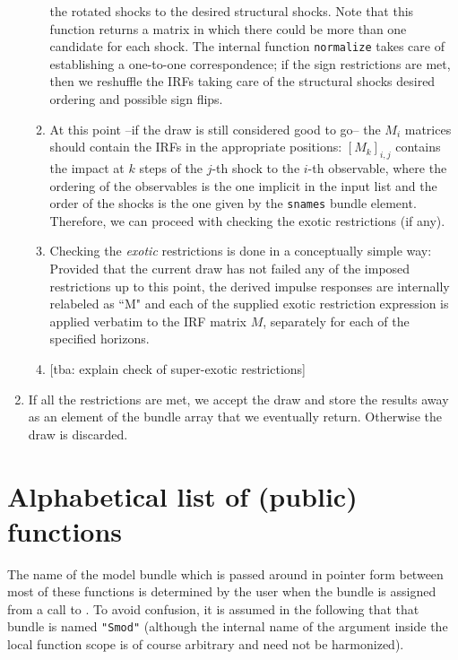 \documentclass[a4paper,10pt]{article}
\newcommand{\dtk}[1]{\texttt{\detokenize{#1}}}
\begin{document}
\begin{enumerate}
\begin{enumerate}
      the rotated shocks to the desired structural shocks. Note that this
      function returns a matrix in which there could be more than one candidate
      for each shock. The internal function \texttt{normalize} takes care of
      establishing a one-to-one correspondence; if the sign restrictions are
      met, then we reshuffle the IRFs taking care of the structural shocks
      desired ordering and possible sign flips.
    \item At this point --if the draw is still considered good to go-- the $M_i$
      matrices should contain the IRFs in the appropriate positions:
      $[M_k]_{i,j}$ contains the impact at $k$ steps of the $j$-th shock to the
      $i$-th observable, where the ordering of the observables is the one
      implicit in the input list and the order of the shocks is the one given by
      the \texttt{snames} bundle element. Therefore, we can proceed with
      checking the exotic restrictions (if any).
    \item Checking the \emph{exotic} restrictions is done in a conceptually
      simple way: Provided that the current draw has not failed any of the
      imposed restrictions up to this point, the derived impulse responses are
      internally relabeled as ``M" and each of the supplied exotic restriction
      expression is applied verbatim to the IRF matrix $M$, separately for each
      of the specified horizons.
    \item{} [tba: explain check of super-exotic restrictions]  
      
    \end{enumerate}
  \item If all the restrictions are met, we accept the draw and store the
    results away as an element of the bundle array that we eventually
    return. Otherwise the draw is discarded.
\end{enumerate}

\clearpage

\section{Alphabetical list of (public) functions}
\label{sec:syntax}

The name of the model bundle which is passed around in pointer form between 
most of these functions is determined by the user when the bundle is assigned
from a call to \dtk{SVAR_setup}. To avoid confusion, it is assumed in the
following that that bundle is named \texttt{"Smod"} (although the internal 
name of the argument inside the local function scope is of course arbitrary 
and need not be harmonized). 
\end{document}
